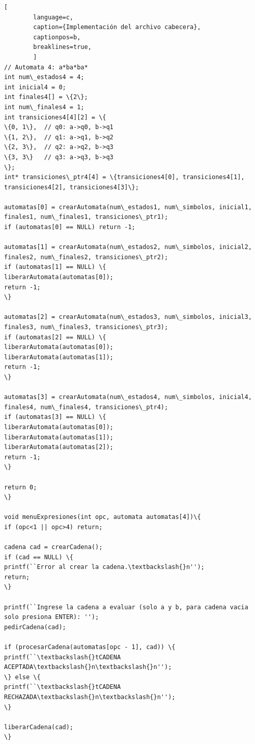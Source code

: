 \documentclass[letterpaper,11pt,twoside]{article}
\begin{document}
\begin{lstlisting}[
		language=c,
		caption={Implementación del archivo cabecera},
		captionpos=b,
		breaklines=true,		
		]
// Automata 4: a*ba*ba*
int num\_estados4 = 4;
int inicial4 = 0;
int finales4[] = \{2\};
int num\_finales4 = 1;
int transiciones4[4][2] = \{
\{0, 1\},  // q0: a->q0, b->q1
\{1, 2\},  // q1: a->q1, b->q2
\{2, 3\},  // q2: a->q2, b->q3
\{3, 3\}   // q3: a->q3, b->q3
\};
int* transiciones\_ptr4[4] = \{transiciones4[0], transiciones4[1], transiciones4[2], transiciones4[3]\};

automatas[0] = crearAutomata(num\_estados1, num\_simbolos, inicial1,
finales1, num\_finales1, transiciones\_ptr1);
if (automatas[0] == NULL) return -1;

automatas[1] = crearAutomata(num\_estados2, num\_simbolos, inicial2,
finales2, num\_finales2, transiciones\_ptr2);
if (automatas[1] == NULL) \{
liberarAutomata(automatas[0]);
return -1;
\}

automatas[2] = crearAutomata(num\_estados3, num\_simbolos, inicial3,
finales3, num\_finales3, transiciones\_ptr3);
if (automatas[2] == NULL) \{
liberarAutomata(automatas[0]);
liberarAutomata(automatas[1]);
return -1;
\}

automatas[3] = crearAutomata(num\_estados4, num\_simbolos, inicial4,
finales4, num\_finales4, transiciones\_ptr4);
if (automatas[3] == NULL) \{
liberarAutomata(automatas[0]);
liberarAutomata(automatas[1]);
liberarAutomata(automatas[2]);
return -1;
\}

return 0;
\}

void menuExpresiones(int opc, automata automatas[4])\{
if (opc<1 || opc>4) return;

cadena cad = crearCadena();
if (cad == NULL) \{
printf(``Error al crear la cadena.\textbackslash{}n'');
return;
\}

printf(``Ingrese la cadena a evaluar (solo a y b, para cadena vacia solo presiona ENTER): '');
pedirCadena(cad);

if (procesarCadena(automatas[opc - 1], cad)) \{
printf(``\textbackslash{}tCADENA ACEPTADA\textbackslash{}n\textbackslash{}n'');
\} else \{
printf(``\textbackslash{}tCADENA RECHAZADA\textbackslash{}n\textbackslash{}n'');
\}

liberarCadena(cad);
\}

	\end{lstlisting}
	
	\cleardoublepage
	
\end{document}
